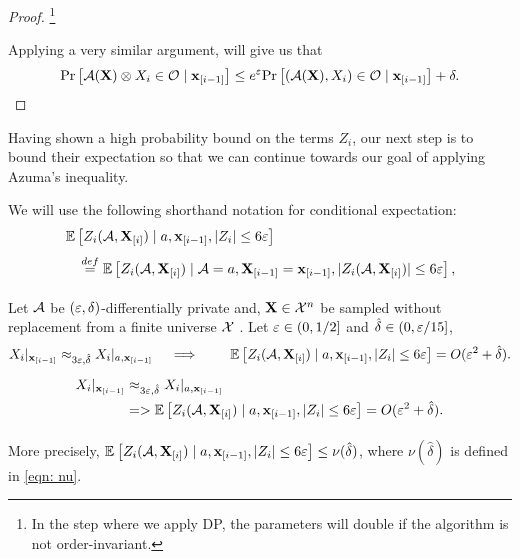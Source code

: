 \begin{proof}
\footnote{In the step where we apply DP, the parameters will double if the algorithm is not order-invariant.}

Applying a very similar argument, will give us that
$$\mathrm{Pr}\left[\mathcal{A}(\mathbf{X}) \otimes X_i   \in \mathcal{O}  \mid \mathbf{x}_{[i-1]}\right]  \leq e^\varepsilon  \mathrm{Pr}\left[(\mathcal{A}(\mathbf{X}),X_i) \in \mathcal{O} \mid \mathbf{x}_{[i-1]}\right]+ \delta.$$
\end{proof}

Having shown a high probability bound on the terms $Z_i$, our next step is to bound their expectation so that we can continue towards our goal of applying Azuma's inequality. 

We will use the following shorthand notation for conditional expectation:
\begin{align*}& \Ex{}{Z_i(\cA,\bX_{[i]})\mid a,\bbx_{[i-1]}, \abs{Z_i}\leq 6\eps} \\ & \quad 
\stackrel{def}{=} \Ex{}{Z_i(\cA,\bX_{[i]})\mid \cA=a,\bX_{[i-1]}=\bbx_{[i-1]}, \abs{Z_i(\cA,\bX_{[i]})}\leq 6\eps}, 
\end{align*}

\begin{lemma}\label{lem:exp_Z}
Let $\mathcal{A}$ be $(\varepsilon,\delta)$-differentially private and, $\mathbf{X} \in \mathcal{X}^n$ be sampled without replacement from a finite universe $\mathcal{X}$ . Let $\varepsilon \in (0,1/2]$ and $\hat{\delta} \in \left (0,\varepsilon/15 \right ]$,
\ifnum{}
\begin{equation*}
{X_i|_{\mathbf{x}_{[i-1]}} \approx_{3\varepsilon,\hat{\delta}} X_i|_{a, \mathbf{x}_{[i-1]}}}\quad \implies  \qquad \operatorname*{\mathbb{E}}_{}\left[Z_i(\mathcal{A},\mathbf{X}_{[i]})\mid a,\mathbf{x}_{[i-1]}, \vert Z_i\rvert\leq 6\varepsilon\right] = O(\varepsilon^2 + \hat\delta).
\end{equation*}
\else
\begin{align*}
X_i|_{\mathbf{x}_{[i-1]}} & \approx_{3\varepsilon,\hat{\delta}}  X_i|_{a, \mathbf{x}_{[i-1]}} \\
& => \operatorname*{\mathbb{E}}_{}\left[Z_i(\mathcal{A},\mathbf{X}_{[i]})\mid a,\mathbf{x}_{[i-1]}, \vert Z_i\rvert\leq 6\varepsilon\right] = O(\varepsilon^2 + \hat\delta).
\end{align*}
\fi

More precisely, $\operatorname*{\mathbb{E}}_{}\left[Z_i(\mathcal{A},\mathbf{X}_{[i]})\mid a,\mathbf{x}_{[i-1]}, \vert Z_i\rvert\leq 6\varepsilon\right] \leq \nu (\hat{\delta})$, where $\nu (\hat{\delta})$ is defined in \eqref{eqn: nu}.
\end{lemma}

